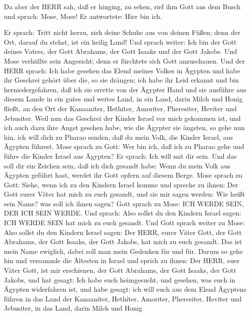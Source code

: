  Da aber der HERR sah, daß er hinging, zu sehen, rief ihm
Gott aus dem Busch und sprach: Mose, Mose! Er antwortete: Hier bin ich.

 Er sprach: Tritt nicht herzu, zieh deine Schuhe aus von
deinen Füßen; denn der Ort, darauf du stehst, ist ein heilig Land!
 Und sprach weiter: Ich bin der Gott deines Vaters, der Gott
Abrahams, der Gott Isaaks und der Gott Jakobs. Und Mose verhüllte sein
Angesicht; denn er fürchtete sich Gott anzuschauen.  Und der
HERR sprach: Ich habe gesehen das Elend meines Volkes in Ägypten und
habe ihr Geschrei gehört über die, so sie drängen; ich habe ihr Leid
erkannt  und bin herniedergefahren, daß ich sie errette von
der Ägypter Hand und sie ausführe aus diesem Lande in ein gutes und
weites Land, in ein Land, darin Milch und Honig fließt, an den Ort der
Kanaaniter, Hethiter, Amoriter, Pheresiter, Heviter und Jebusiter.
 Weil nun das Geschrei der Kinder Israel vor mich gekommen
ist, und ich auch dazu ihre Angst gesehen habe, wie die Ägypter sie
ängsten,  so gehe nun hin, ich will dich zu Pharao senden,
daß du mein Volk, die Kinder Israel, aus Ägypten führest. 
Mose sprach zu Gott: Wer bin ich, daß ich zu Pharao gehe und führe die
Kinder Israel aus Ägypten?  Er sprach: Ich will mit dir
sein. Und das soll dir ein Zeichen sein, daß ich dich gesandt habe: Wenn
du mein Volk aus Ägypten geführt hast, werdet ihr Gott opfern auf diesem
Berge.  Mose sprach zu Gott: Siehe, wenn ich zu den Kindern
Israel komme und spreche zu ihnen: Der Gott eurer Väter hat mich zu euch
gesandt, und sie mir sagen werden: Wie heißt sein Name? was soll ich
ihnen sagen?  Gott sprach zu Mose: ICH WERDE SEIN, DER ICH
SEIN WERDE. Und sprach: Also sollst du den Kindern Israel sagen: ICH
WERDE SEIN hat mich zu euch gesandt.  Und Gott sprach
weiter zu Mose: Also sollst du den Kindern Israel sagen: Der HERR, eurer
Väter Gott, der Gott Abrahams, der Gott Isaaks, der Gott Jakobs, hat
mich zu euch gesandt. Das ist mein Name ewiglich, dabei soll man mein
Gedenken für und für.  Darum so gehe hin und versammle die
Ältesten in Israel und sprich zu ihnen: Der HERR, euer Väter Gott, ist
mir erschienen, der Gott Abrahams, der Gott Isaaks, der Gott Jakobs, und
hat gesagt: Ich habe euch heimgesucht, und gesehen, was euch in Ägypten
widerfahren ist,  und habe gesagt: ich will euch aus dem
Elend Ägyptens führen in das Land der Kanaaniter, Hethiter, Amoriter,
Pheresiter, Heviter und Jebusiter, in das Land, darin Milch und Honig
